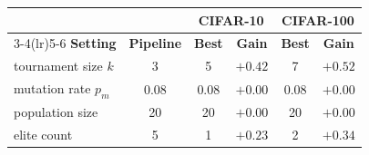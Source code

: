 \begin{tabular}{l c cc cc}
\toprule
& & \multicolumn{2}{c}{CIFAR-10} & \multicolumn{2}{c}{CIFAR-100} \\
\cmidrule(lr){3-4}\cmidrule(lr){5-6}
\textbf{Setting} & \textbf{Pipeline} & \textbf{Best} & \textbf{Gain} & \textbf{Best} & \textbf{Gain} \\
\midrule
tournament size $k$ & 3 & 5 & $+0.42$ & 7 & $+0.52$ \\
mutation rate $p_m$ & 0.08 & 0.08 & $+0.00$ & 0.08 & $+0.00$ \\
population size & 20 & 20 & $+0.00$ & 20 & $+0.00$ \\
elite count & 5 & 1 & $+0.23$ & 2 & $+0.34$ \\
\bottomrule
\end{tabular}
